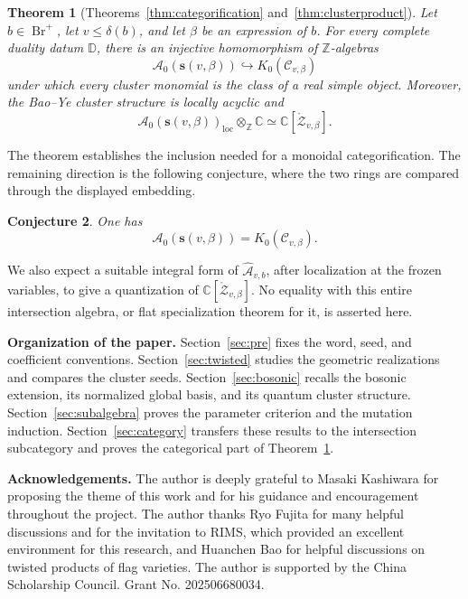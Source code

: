 \documentclass[12pt, reqno]{amsart}
\theoremstyle{plain}
\newtheorem{theorem}{Theorem}[section]
\newtheorem{conjecture}[theorem]{Conjecture}
\theoremstyle{definition}
\numberwithin{equation}{section}
\begin{document}
\begin{theorem}[{Theorems~\ref{thm:categorification} and~\ref{thm:clusterproduct}}]
\label{thm:main-intro}
Let $b\in\operatorname{Br}^+$, let $v\le\delta(b)$, and let $\beta$
be an expression of $b$. For every complete duality datum $\mathbb D$,
there is an injective homomorphism of $\mathbb Z$-algebras
\[
\mathcal A_0(\mathbf s(v,\beta))
\hookrightarrow K_0(\mathscr C_{v,\beta})
\]
under which every cluster monomial is the class of a real simple object.
Moreover, the Bao--Ye cluster structure is locally acyclic and
\[
\mathcal A_0(\mathbf s(v,\beta))_{\mathrm{loc}}
\otimes_{\mathbb Z}\mathbb C
\simeq \mathbb C[\mathring{\mathcal Z}_{v,\beta}].
\]
\end{theorem}

The theorem establishes the inclusion needed for a monoidal
categorification. The remaining direction is the following conjecture,
where the two rings are compared through the displayed embedding.
\begin{conjecture}\label{conj:full-categorification}
One has
\[
\mathcal A_0(\mathbf s(v,\beta))=K_0(\mathscr C_{v,\beta}).
\]
\end{conjecture}
We also expect a suitable integral form of
$\widehat{\mathcal A}_{v,b}$, after localization at the frozen
variables, to give a quantization of
$\mathbb C[\mathring{\mathcal Z}_{v,\beta}]$.
No equality with this entire intersection algebra, or flat
specialization theorem for it, is asserted here.

\medskip
\noindent\textbf{Organization of the paper.}
Section~\ref{sec:pre} fixes the word, seed, and coefficient conventions.
Section~\ref{sec:twisted} studies the geometric realizations and compares
the cluster seeds. Section~\ref{sec:bosonic} recalls the bosonic
extension, its normalized global basis, and its quantum cluster
structure. Section~\ref{sec:subalgebra} proves the parameter criterion
and the mutation induction. Section~\ref{sec:category} transfers these
results to the intersection subcategory and proves the categorical
part of Theorem~\ref{thm:main-intro}.

\medskip
\noindent\textbf{Acknowledgements.}
The author is deeply grateful to Masaki Kashiwara for proposing the
theme of this work and for his guidance and encouragement throughout
the project. The author thanks Ryo Fujita for many helpful discussions
and for the invitation to RIMS, which provided an excellent environment
for this research, and Huanchen Bao for helpful discussions on twisted
products of flag varieties. The author is supported by the China
Scholarship Council. Grant No. 202506680034.
\end{document}
